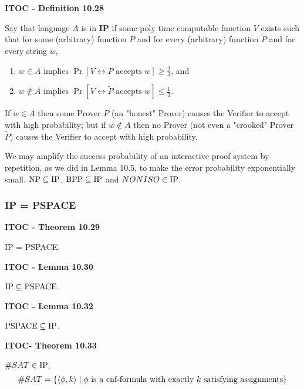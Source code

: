 \begin{shaded}
\textbf{ITOC - Definition 10.28}

\medskip
Say that language $A$ is in \textbf{IP} if some poly time computable function $V$ exists such that for some (arbitrary) function $P$ and for every (arbitrary) function $\tilde{P}$ and for every string $w$,
\begin{enumerate}
\item $w \in A$ implies $\Pr[V \leftrightarrow P \text{ accepts } w] \geq \frac{2}{3}$, and
\item $w \not \in A$ implies $\Pr[V \leftrightarrow \tilde{P} \text{ accepts } w] \leq \frac{1}{3}$.
\end{enumerate}
\end{shaded}

If $w\in A$ then some Prover $P$ (an "honest" Prover) causes the Verifier to accept with high probability;  but if $w \not \in A$ then no Prover (not even a "crooked" Prover $\tilde{P}$) causes the Verifier to accept with high probability.

We may amplify the success probability of an interactive proof system by repetition, as we did in Lemma 10.5, to make the error probability exponentially small. $\text{NP} \subseteq \text{IP}$, $\text{BPP} \subseteq \text{IP}$ and $NONISO \in \text{IP}$.

\subsubsection{IP = PSPACE}

\begin{shaded}
\textbf{ITOC - Theorem 10.29}

\medskip
IP = PSPACE.
\end{shaded}

\begin{shaded}
\textbf{ITOC - Lemma 10.30}

\medskip
$\text{IP} \subseteq \text{PSPACE}$.
\end{shaded}

\begin{shaded}
\textbf{ITOC - Lemma 10.32}

\medskip
$\text{PSPACE} \subseteq  \text{IP}$.
\end{shaded}

\begin{shaded}
\textbf{ITOC- Theorem 10.33}

\medskip
$\#SAT \in \text{IP}$.
\[
\#SAT = \{\langle{\phi ,k}\rangle \mid \phi \text{ is a cnf-formula with exactly $k$ satisfying assignments} \}
\]
\end{shaded}


